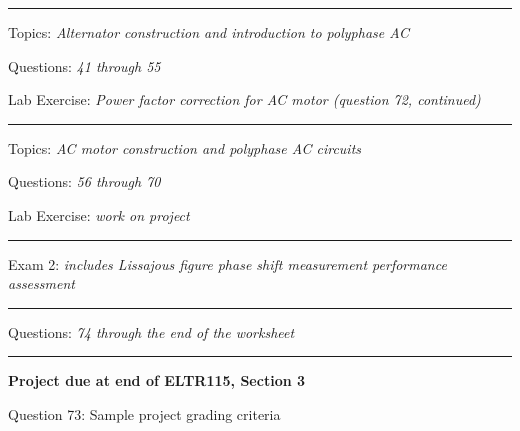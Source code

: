 \vskip 10pt
\hrule \vskip 5pt
\noindent
{}

\hskip 10pt Topics: {\it Alternator construction and introduction to polyphase AC}
 
\hskip 10pt Questions: {\it 41 through 55}
 
\hskip 10pt Lab Exercise: {\it Power factor correction for AC motor (question 72, continued)}
 


\vskip 10pt
\hrule \vskip 5pt
\noindent
{}

\hskip 10pt Topics: {\it AC motor construction and polyphase AC circuits}
 
\hskip 10pt Questions: {\it 56 through 70}
 
\hskip 10pt Lab Exercise: {\it work on project}
 




\vskip 10pt
\hrule \vskip 5pt
\noindent
{}

\hskip 10pt Exam 2: {\it includes Lissajous figure phase shift measurement performance assessment}
 
\vskip 10pt
\hrule \vskip 5pt
\noindent
{}

\hskip 10pt Questions: {\it 74 through the end of the worksheet}
 
\vskip 10pt
\hrule \vskip 5pt
\noindent
{}

\hskip 10pt {\bf Project due at end of ELTR115, Section 3}
 
\hskip 10pt Question 73: Sample project grading criteria
 
\vskip 10pt











